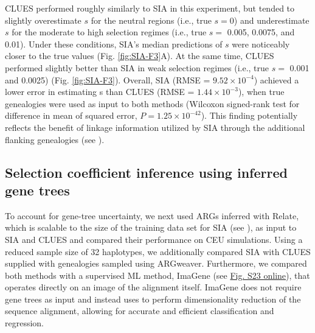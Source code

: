 CLUES performed roughly similarly to \ac{SIA} in this experiment, but tended to slightly overestimate $s$ for the neutral regions (i.e., true $s=0$) and underestimate $s$ for the moderate to high selection regimes (i.e., true $s=$ 0.005, 0.0075, and 0.01). Under these conditions, \ac{SIA}’s median predictions of $s$ were noticeably closer to the true values (Fig. \ref{fig:SIA-F3}A). At the same time, CLUES performed slightly better than \ac{SIA} in weak selection regimes (i.e., true $s=$ 0.001 and 0.0025) (Fig. \ref{fig:SIA-F3}). Overall, \ac{SIA} (\ac{RMSE} = $9.52\times 10^{-4}$) achieved a lower error in estimating s than CLUES (\ac{RMSE} = $1.44\times 10^{-3}$), when true genealogies were used as input to both methods (Wilcoxon signed-rank test for difference in mean of squared error, $P=1.25\times 10^{-42}$). This finding potentially reflects the benefit of linkage information utilized by \ac{SIA} through the additional flanking genealogies (see ).

\subsection{Selection coefficient inference using inferred gene trees}
To account for gene-tree uncertainty, we next used \acp{ARG} inferred with Relate, which is scalable to the size of the training data set for \ac{SIA} (see ), as input to \ac{SIA} and CLUES and compared their performance on CEU simulations. Using a reduced sample size of 32 haplotypes, we additionally compared \ac{SIA} with CLUES supplied with genealogies sampled using ARGweaver. Furthermore, we compared both methods with a supervised \ac{ML} method, ImaGene (see \href{https://academic.oup.com/mbe/article/39/1/msab332/6433161#supplementary-data}{Fig. S23 online}), that operates directly on an image of the alignment itself. ImaGene does not require gene trees as input and instead uses  to perform dimensionality reduction of the sequence alignment, allowing for accurate and efficient classification and regression.


